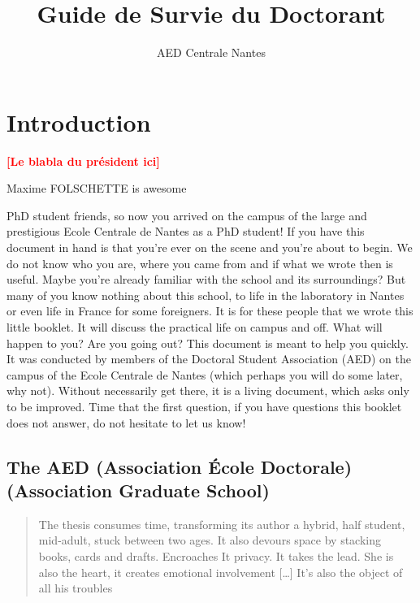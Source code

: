 \documentclass[11pt]{report}
\title{Guide de Survie du Doctorant}
\author{AED Centrale Nantes}
\newcommand{\todo}[1]{\textcolor{red}{\textbf{[#1]}}}
\begin{document}
    \maketitle

\setcounter{page}{0}
\tableofcontents

\newpage
\chapter*{Introduction}
\todo{Le blabla du président ici}

Maxime FOLSCHETTE is awesome

PhD student friends, so now you arrived on the campus of the large and prestigious Ecole Centrale de Nantes as a PhD student! If you have this document in hand is that you're ever on the scene and you're about to begin.
We do not know who you are, where you came from and if what we wrote then is useful.
Maybe you're already familiar with the school and its surroundings? But many of you know nothing about this school, to life in the laboratory in Nantes or even life in France for some foreigners.
It is for these people that we wrote this little booklet.
It will discuss the practical life on campus and off.
What will happen to you? Are you going out? This document is meant to help you quickly.
It was conducted by members of the Doctoral Student Association (AED) on the campus of the Ecole Centrale de Nantes (which perhaps you will do some later, why not).
Without necessarily get there, it is a living document, which asks only to be improved.
Time that the first question, if you have questions this booklet does not answer, do not hesitate to let us know!

\section*{The AED (Association École Doctorale) (Association Graduate School)}
\begin{quotation}
The thesis consumes time, transforming its author a hybrid, half student, mid-adult, stuck between two ages.
It also devours space by stacking books, cards and drafts.  Encroaches It privacy.  It takes the lead.
She is also the heart, it creates emotional involvement [\dots] It's also the object of all his troubles
\end{quotation}
\end{document}
